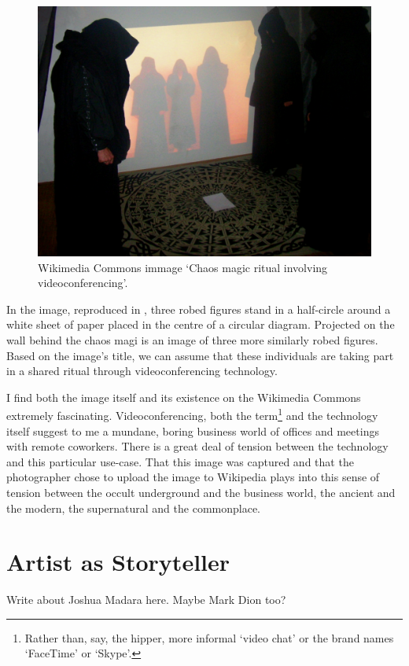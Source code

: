 \documentclass[a4paper,nobib]{tufte-handout}
\begin{document}
\begin{figure}
    \includegraphics{videoconferencing}
    \caption{Wikimedia Commons immage `Chaos magic ritual involving videoconferencing'.}
    \label{fig:videoconf}
\end{figure}

In the image, reproduced in \autocite{wiki:chaos}, three robed figures stand in a half-circle around a white sheet of paper placed in the centre of a circular diagram. Projected on the wall behind the chaos magi is an image of three more similarly robed figures. Based on the image's title, we can assume that these individuals are taking part in a shared ritual through videoconferencing technology.

I find both the image itself and its existence on the Wikimedia Commons extremely fascinating. Videoconferencing, both the term\footnote{Rather than, say, the hipper, more informal `video chat' or the brand names `FaceTime' or `Skype'.} and the technology itself suggest to me a mundane, boring business world of offices and meetings with remote coworkers. There is a great deal of tension between the technology and this particular use-case. That this image was captured and that the photographer chose to upload the image to Wikipedia plays into this sense of tension between the occult underground and the business world, the ancient and the modern, the supernatural and the commonplace.

\section{Artist as Storyteller}
Write about Joshua Madara here\autocite{madara,madarabeing,madaramagic}. Maybe Mark Dion too?

\printbibliography
\end{document}
